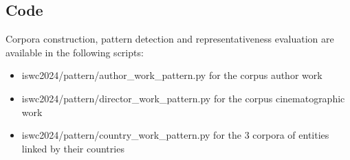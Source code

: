 \documentclass[runningheads]{llncs}
\begin{document}
\subsection{Code}
Corpora construction, pattern detection and representativeness evaluation are available in the following scripts:
\begin{itemize}
	\item iswc2024/pattern/author\_work\_pattern.py for the corpus author work
	\item iswc2024/pattern/director\_work\_pattern.py for the corpus cinematographic work
	\item iswc2024/pattern/country\_work\_pattern.py for the 3 corpora of entities linked by their countries 
\end{itemize}
\end{document}
